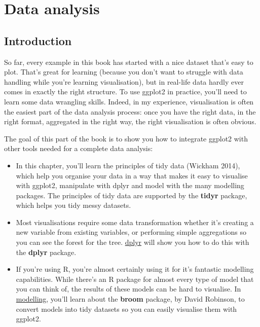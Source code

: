 \chapter{Data analysis}\label{cha:data}

\section{Introduction}

So far, every example in this book has started with a nice dataset
that's easy to plot. That's great for learning (because you don't want
to struggle with data handling while you're learning visualisation), but
in real-life data hardly ever comes in exactly the right structure. To
use ggplot2 in practice, you'll need to learn some data wrangling
skills. Indeed, in my experience, visualisation is often the easiest
part of the data analysis process: once you have the right data, in the
right format, aggregated in the right way, the right visualisation is
often obvious.

The goal of this part of the book is to show you how to integrate
ggplot2 with other tools needed for a complete data analysis:

\begin{itemize}
\item
  In this chapter, you'll learn the principles of tidy data (Wickham
  2014), which help you organise your data in a way that makes it easy
  to visualise with ggplot2, manipulate with dplyr and model with the
  many modelling packages. The principles of tidy data are supported by
  the \textbf{tidyr} package, which helps you tidy messy datasets.
\item
  Most visualisations require some data transformation whether it's
  creating a new variable from existing variables, or performing simple
  aggregations so you can see the forest for the tree.
  \hyperref[cha:dplyr]{dplyr} will show you how to do this with the
  \textbf{dplyr} package.
\item
  If you're using R, you're almost certainly using it for it's fantastic
  modelling capabilities. While there's an R package for almost every
  type of model that you can think of, the results of these models can
  be hard to visualise. In \hyperref[cha:modelling]{modelling}, you'll
  learn about the \textbf{broom} package, by David Robinson, to convert
  models into tidy datasets so you can easily visualise them with
  ggplot2.
\end{itemize}

